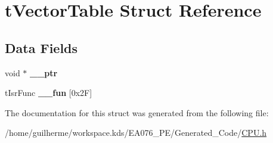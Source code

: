 \hypertarget{structt_vector_table}{}\section{t\+Vector\+Table Struct Reference}
\label{structt_vector_table}
\subsection*{Data Fields}
\begin{DoxyCompactItemize}
\item 
\mbox{\label{structt_vector_table_a324d365e9c8c6c033f4edbc906f94844}} 
void $\ast$ {\bfseries \+\_\+\+\_\+ptr}
\item 
\mbox{\label{structt_vector_table_aeef9a059db36607f5d6f00cfc5a50f4e}} 
t\+Isr\+Func {\bfseries \+\_\+\+\_\+fun} \mbox{[}0x2\+F\mbox{]}
\end{DoxyCompactItemize}


The documentation for this struct was generated from the following file\+:\begin{DoxyCompactItemize}
\item 
/home/guilherme/workspace.\+kds/\+E\+A076\+\_\+\+P\+E/\+Generated\+\_\+\+Code/\hyperlink{_c_p_u_8h}{C\+P\+U.\+h}\end{DoxyCompactItemize}
